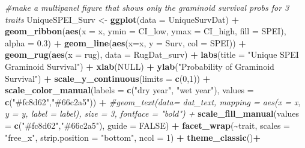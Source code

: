 \documentclass[
]{article}
\newenvironment{Shaded}{\begin{snugshade}}{\end{snugshade}}
\newcommand{\CommentTok}[1]{\textcolor[rgb]{0.56,0.35,0.01}{\textit{#1}}}
\newcommand{\DataTypeTok}[1]{\textcolor[rgb]{0.13,0.29,0.53}{#1}}
\newcommand{\DecValTok}[1]{\textcolor[rgb]{0.00,0.00,0.81}{#1}}
\newcommand{\FloatTok}[1]{\textcolor[rgb]{0.00,0.00,0.81}{#1}}
\newcommand{\KeywordTok}[1]{\textcolor[rgb]{0.13,0.29,0.53}{\textbf{#1}}}
\newcommand{\NormalTok}[1]{#1}
\newcommand{\OperatorTok}[1]{\textcolor[rgb]{0.81,0.36,0.00}{\textbf{#1}}}
\newcommand{\OtherTok}[1]{\textcolor[rgb]{0.56,0.35,0.01}{#1}}
\newcommand{\StringTok}[1]{\textcolor[rgb]{0.31,0.60,0.02}{#1}}
\begin{document}
\begin{Shaded}
\begin{Highlighting}[]
\CommentTok{\#make a multipanel figure that shows only the graminoid survival probs for 3 traits}
\NormalTok{UniqueSPEI\_Surv \textless{}{-}}\StringTok{ }\KeywordTok{ggplot}\NormalTok{(}\DataTypeTok{data =}\NormalTok{ UniqueSurvDat) }\OperatorTok{+}
\StringTok{  }\KeywordTok{geom\_ribbon}\NormalTok{(}\KeywordTok{aes}\NormalTok{(}\DataTypeTok{x =}\NormalTok{ x, }\DataTypeTok{ymin =}\NormalTok{ CI\_low, }\DataTypeTok{ymax =}\NormalTok{ CI\_high, }\DataTypeTok{fill =}\NormalTok{ SPEI), }\DataTypeTok{alpha =} \FloatTok{0.3}\NormalTok{) }\OperatorTok{+}
\StringTok{  }\KeywordTok{geom\_line}\NormalTok{(}\KeywordTok{aes}\NormalTok{(}\DataTypeTok{x=}\NormalTok{x, }\DataTypeTok{y =}\NormalTok{ Surv, }\DataTypeTok{col =}\NormalTok{ SPEI))  }\OperatorTok{+}\StringTok{ }
\StringTok{  }\KeywordTok{geom\_rug}\NormalTok{(}\KeywordTok{aes}\NormalTok{(}\DataTypeTok{x =}\NormalTok{ rug), }\DataTypeTok{data =}\NormalTok{ RugDat\_surv) }\OperatorTok{+}
\StringTok{  }\KeywordTok{labs}\NormalTok{(}\DataTypeTok{title =} \StringTok{"Unique SPEI Graminoid Survival"}\NormalTok{) }\OperatorTok{+}
\StringTok{  }\KeywordTok{xlab}\NormalTok{(}\OtherTok{NULL}\NormalTok{) }\OperatorTok{+}
\StringTok{  }\KeywordTok{ylab}\NormalTok{(}\StringTok{"Probability of Graminoid Survival"}\NormalTok{) }\OperatorTok{+}
\StringTok{  }\KeywordTok{scale\_y\_continuous}\NormalTok{(}\DataTypeTok{limits =} \KeywordTok{c}\NormalTok{(}\DecValTok{0}\NormalTok{,}\DecValTok{1}\NormalTok{)) }\OperatorTok{+}
\StringTok{  }\KeywordTok{scale\_color\_manual}\NormalTok{(}\DataTypeTok{labels =} \KeywordTok{c}\NormalTok{(}\StringTok{"dry year"}\NormalTok{, }\StringTok{"wet year"}\NormalTok{), }\DataTypeTok{values =} \KeywordTok{c}\NormalTok{(}\StringTok{"\#fc8d62"}\NormalTok{,}\StringTok{"\#66c2a5"}\NormalTok{)) }\OperatorTok{+}
\StringTok{  }\CommentTok{\#geom\_text(data= dat\_text, mapping = aes(x = x, y = y, label = label), size = 3, fontface = "bold") +}
\StringTok{  }\KeywordTok{scale\_fill\_manual}\NormalTok{(}\DataTypeTok{values =} \KeywordTok{c}\NormalTok{(}\StringTok{"\#fc8d62"}\NormalTok{,}\StringTok{"\#66c2a5"}\NormalTok{), }\DataTypeTok{guide =} \OtherTok{FALSE}\NormalTok{) }\OperatorTok{+}
\StringTok{  }\KeywordTok{facet\_wrap}\NormalTok{(}\OperatorTok{\textasciitilde{}}\NormalTok{trait, }\DataTypeTok{scales =} \StringTok{"free\_x"}\NormalTok{, }\DataTypeTok{strip.position =}  \StringTok{"bottom"}\NormalTok{, }\DataTypeTok{ncol =} \DecValTok{1}\NormalTok{) }\OperatorTok{+}
\StringTok{  }\KeywordTok{theme\_classic}\NormalTok{()}\OperatorTok{+}

\end{Highlighting}
\end{Shaded}
\end{document}
